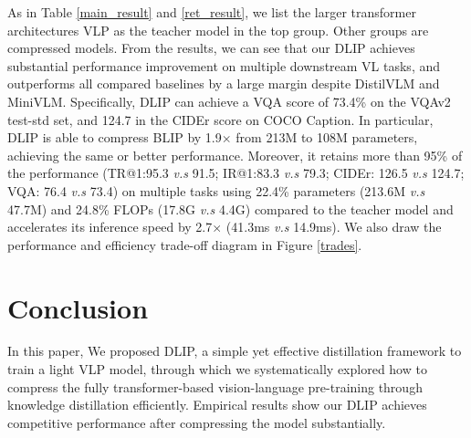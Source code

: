 \documentclass[10pt,twocolumn,letterpaper]{article}
\begin{document}
As in Table \ref{main_result} and \ref{ret_result}, we list the larger transformer architectures VLP as the teacher model in the top group. Other groups are compressed models. 
From the results, we can see that our DLIP achieves substantial performance
improvement on multiple downstream VL tasks, and outperforms all compared baselines by a large margin despite DistilVLM and MiniVLM. Specifically, DLIP 
can achieve a VQA score of 73.4\% on the VQAv2 test-std set, and 124.7 in the CIDEr score on COCO Caption.
In particular, DLIP is able to compress BLIP\cite{li2022blip} by 1.9$\times$ from 213M to 108M parameters, achieving the same or better performance.
Moreover, it retains more than 95\% of the performance (TR@1:95.3 \emph{v.s} 91.5; IR@1:83.3 \emph{v.s} 79.3; CIDEr: 126.5 \emph{v.s} 124.7; VQA: 76.4 \emph{v.s} 73.4) on multiple tasks using 22.4\% parameters (213.6M \emph{v.s} 47.7M) and 24.8\% FLOPs (17.8G \emph{v.s} 4.4G) compared to the teacher model and accelerates its inference speed by 2.7$\times$ (41.3ms \emph{v.s} 14.9ms). 
We also draw the performance and efficiency trade-off diagram in Figure \ref{trades}.

\section{Conclusion} 
In this paper, We proposed DLIP, a simple yet effective distillation framework to train a light VLP model, through which we systematically explored how to compress the fully transformer-based vision-language pre-training through knowledge distillation efficiently.  
Empirical results show our DLIP achieves competitive performance after compressing the model substantially.

{\small


}
\end{document}

